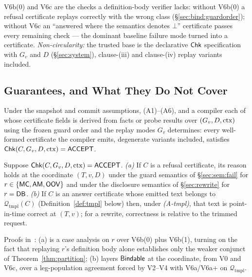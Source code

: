  V6b(0) and V6c are the checks a definition-body verifier
lacks: without V6b(0) a refusal certificate replays correctly with the
wrong class (\S\ref{sec:bind:guardorder}); without V6c an ``answered where
the semantics denotes $\bot$'' certificate passes every remaining check ---
the dominant baseline failure mode turned into a certificate. \emph{Non-circularity:} the trusted base is the declarative
$\mathsf{Chk}$ specification with $G_v$ and $D$ (\S\ref{sec:system}),
clause-(iii) and clause-(iv) replay variants included.

\subsection{Guarantees, and What They Do Not Cover}
\label{sec:cert:thms}

\begin{theorem}
\label{thm:certcomplete}
 Under the snapshot and commit assumptions, (A1)--(A6), and a compiler each of
whose certificate fields is derived from facts or probe results over
$(G_v,D,\mathrm{ctx})$ using the frozen guard order and the replay modes $G_v$
determines: every
well-formed certificate the compiler emits, degenerate variants included,
satisfies $\mathsf{Chk}(C,G_v,D,\mathrm{ctx})=\mathsf{ACCEPT}$.
\end{theorem}

\begin{theorem}
\label{thm:certsound}
 Suppose $\mathsf{Chk}(C,G_v,\allowbreak D,\mathrm{ctx})=\mathsf{ACCEPT}$. \emph{(a)} If $C$ is a refusal
certificate,
its reason holds at the coordinate $(T,v,D)$ under the guard semantics of
\S\ref{sec:sem:fail} for $r\in\{\mathsf{MC},\allowbreak\mathsf{AM},\mathsf{OOV}\}$ and under the
disclosure
semantics of \S\ref{sec:rewrite} for $r=\mathsf{DB}$. \emph{(b)} If $C$ is an answer
certificate whose emitted text belongs to
$\mathcal{Q}_{\mathrm{tmpl}}(C)$ (Definition~\ref{def:tmpl} below) then,
under \emph{(A-tmpl)}, that text is point-in-time
correct at $(T,v)$; for a rewrite, correctness is relative to the trimmed
request.
\end{theorem}

\noindent{} Proofs in~\cite{asofgov-tr}: (a) is a case analysis on $r$ over
V6b(0) plus V6b(1), turning on the fact that replaying $r$'s definition body
alone establishes only the weaker conjunct of Theorem~\ref{thm:partition}; (b)
layers $\mathsf{Bindable}$ at the coordinate, from V0 and V6c, over a leg-population
agreement forced by V2--V4 with V6a/V6a+ on $\mathcal{Q}_{\mathrm{tmpl}}$.

